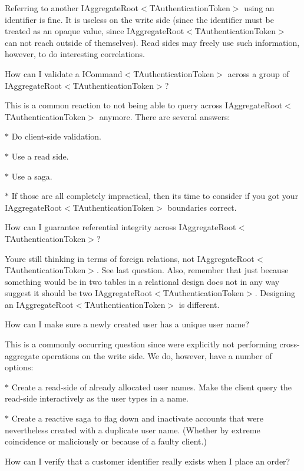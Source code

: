 Referring to another I\+Aggregate\+Root$<$\+T\+Authentication\+Token$>$ using an identifier is fine. It is useless on the write side (since the identifier must be treated as an opaque value, since I\+Aggregate\+Root$<$\+T\+Authentication\+Token$>$ can not reach outside of themselves). Read sides may freely use such information, however, to do interesting correlations. 

How can I validate a I\+Command$<$\+T\+Authentication\+Token$>$ across a group of I\+Aggregate\+Root$<$\+T\+Authentication\+Token$>$? 

This is a common reaction to not being able to query across I\+Aggregate\+Root$<$\+T\+Authentication\+Token$>$ anymore. There are several answers\+: 

$\ast$ Do client-\/side validation. 

$\ast$ Use a read side. 

$\ast$ Use a saga. 

$\ast$ If those are all completely impractical, then it\textquotesingle{}s time to consider if you got your I\+Aggregate\+Root$<$\+T\+Authentication\+Token$>$ boundaries correct. 

How can I guarantee referential integrity across I\+Aggregate\+Root$<$\+T\+Authentication\+Token$>$? 

You\textquotesingle{}re still thinking in terms of foreign relations, not I\+Aggregate\+Root$<$\+T\+Authentication\+Token$>$. See last question. Also, remember that just because something would be in two tables in a relational design does not in any way suggest it should be two I\+Aggregate\+Root$<$\+T\+Authentication\+Token$>$. Designing an I\+Aggregate\+Root$<$\+T\+Authentication\+Token$>$ is different. 

How can I make sure a newly created user has a unique user name? 

This is a commonly occurring question since we\textquotesingle{}re explicitly not performing cross-\/aggregate operations on the write side. We do, however, have a number of options\+: 

$\ast$ Create a read-\/side of already allocated user names. Make the client query the read-\/side interactively as the user types in a name. 

$\ast$ Create a reactive saga to flag down and inactivate accounts that were nevertheless created with a duplicate user name. (Whether by extreme coincidence or maliciously or because of a faulty client.) 

How can I verify that a customer identifier really exists when I place an order? 

